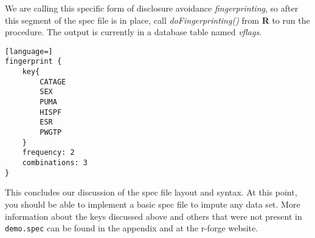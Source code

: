 \documentclass{article}
\begin{document}
We are calling this specific form of disclosure avoidance {\em fingerprinting}, so after
this segment of the spec file is in place, call {\em doFingerprinting()} from \textbf{R} to run the
procedure. The output is currently in a database table named {\em vflags}.

\begin{lstlisting}[language=]
fingerprint {
    key{
        CATAGE
        SEX
        PUMA
        HISPF
        ESR
        PWGTP
    }
    frequency: 2
    combinations: 3
}
\end{lstlisting}


This concludes our discussion of the spec file layout and syntax. At this point, you should be 
able to implement a basic spec file to impute any data set. More information about the keys 
discussed above and others that were not present in {\tt demo.spec} can be found in the appendix and 
at the r-forge website.
\end{document}

